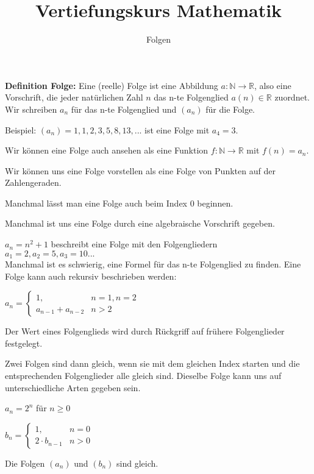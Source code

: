 \documentclass[11pt]{beamer}
\begin{document}
\title{Vertiefungskurs Mathematik}   
\author{Folgen} 
\date{}
\frame{\titlepage} 

\begin{frame}[fragile]


\textbf{Definition Folge:} Eine (reelle) Folge ist eine Abbildung $a: \mathbb{N} \rightarrow \mathbb{R}$, also
eine Vorschrift, die jeder natürlichen Zahl $n$ das n-te Folgenglied $a(n) \in \mathbb{R}$ zuordnet. \pause
Wir schreiben $a_n$ für das n-te Folgenglied und $(a_n)$ für die Folge. \\ \pause
\bigskip

Beispiel: $(a_n) = 1, 1, 2, 3, 5, 8, 13, ... $ ist eine Folge mit $a_4 = 3$. \pause

Wir können eine Folge auch ansehen als eine Funktion $f: \mathbb{N} \rightarrow \mathbb{R}$ mit $f(n) = a_n$. \pause

Wir können uns eine Folge vorstellen als eine Folge von Punkten auf der Zahlengeraden. \pause

Manchmal lässt man eine Folge auch beim Index 0 beginnen.
\end{frame}


\begin{frame}[fragile]
Manchmal ist uns eine Folge durch eine algebraische Vorschrift gegeben. \\ \bigskip \pause

 $a_n = n^2 +1$ \quad beschreibt eine Folge mit den Folgengliedern  \pause \\ $a_1 = 2, a_2 = 5, a_3 = 10 ...$ \\
\bigskip  \pause
Manchmal ist es schwierig, eine Formel für das n-te Folgenglied zu finden. Eine Folge kann auch rekursiv beschrieben werden: \pause \bigskip 

$a_n=\begin{cases}
 1,  & n=1, n=2 \\
 a_{n-1}+a_{n-2} & n > 2 
\end{cases} $
 
Der Wert eines Folgenglieds wird durch Rückgriff auf frühere Folgenglieder festgelegt. 
\end{frame}
 

\begin{frame}[fragile]
Zwei Folgen sind dann gleich, wenn sie mit dem gleichen Index starten und die entsprechenden Folgenglieder alle gleich sind. Dieselbe Folge kann uns auf unterschiedliche Arten gegeben sein.  \pause

$a_n = 2^n$ für $n \ge 0$ \pause

$b_n=\begin{cases}
 1,  & n=0 \\
 2 \cdot b_{n-1} & n > 0 
\end{cases} $  \pause

Die Folgen $(a_n)$ und $(b_n)$ sind gleich.
\end{frame}
\end{document}
